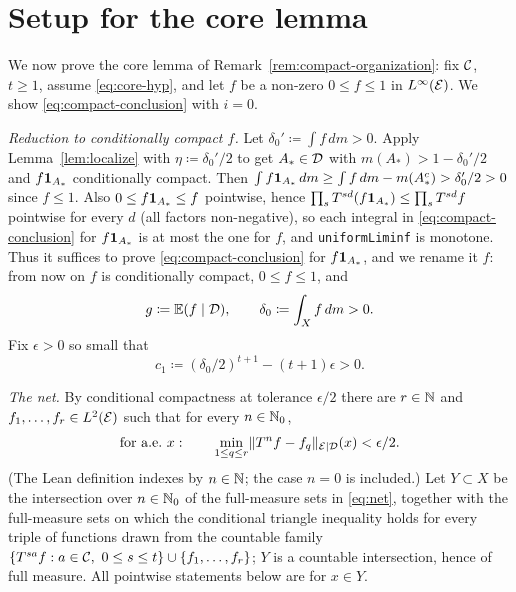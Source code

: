 \section{Setup for the core lemma}

We now prove the core lemma of Remark~\ref{rem:compact-organization}: fix $\mathcal{C}$, $t \geq 1$,
assume \eqref{eq:core-hyp}, and let $f$ be a non-zero $0 \leq f \leq 1$ in $L^{\infty}(\mathcal{E})$.
We show \eqref{eq:compact-conclusion} with $i = 0$.

\emph{Reduction to conditionally compact $f$.}  Let $\delta_0' \coloneqq \int f\,dm > 0$.  Apply
Lemma~\ref{lem:localize} with $\eta \coloneqq \delta_0'/2$ to get $A_\ast \in \mathcal{D}$ with
$m(A_\ast) > 1 - \delta_0'/2$ and $f\mathbf{1}_{A_\ast}$ conditionally compact.  Then
$\int f\mathbf{1}_{A_\ast}\,dm \geq \int f\,dm - m(A_\ast^c) > \delta_0'/2 > 0$ since $f \leq 1$.
Also $0 \leq f\mathbf{1}_{A_\ast} \leq f$ pointwise, hence
$\prod_s T^{sd}(f\mathbf{1}_{A_\ast}) \leq \prod_s T^{sd}f$ pointwise for every $d$ (all factors
non-negative), so each integral in \eqref{eq:compact-conclusion} for $f\mathbf{1}_{A_\ast}$ is at most
the one for $f$, and \texttt{uniformLiminf} is monotone.  Thus it suffices to prove
\eqref{eq:compact-conclusion} for $f\mathbf{1}_{A_\ast}$, and we rename it $f$: from now on $f$ is
conditionally compact, $0 \leq f \leq 1$, and
\[
  g \coloneqq \mathbb{E}(f\mid\mathcal{D}), \qquad \delta_0 \coloneqq \int_X f\,dm > 0 .
\]
Fix $\epsilon > 0$ so small that
\begin{equation}
  \label{eq:eps-choice}
  c_1 \coloneqq (\delta_0/2)^{t+1} - (t+1)\epsilon > 0 .
\end{equation}

\emph{The net.}  By conditional compactness at tolerance $\epsilon/2$ there are $r \in \mathbb{N}$ and
$f_1,\dots,f_r \in L^2(\mathcal{E})$ such that for every $n \in \mathbb{N}_0$,
\begin{equation}
  \label{eq:net}
  \text{for a.e.\ } x : \qquad \min_{1 \leq q \leq r} \lVert T^n f - f_q \rVert_{\mathcal{E} \mid \mathcal{D}}(x) < \epsilon/2 .
\end{equation}
(The Lean definition indexes by $n \in \mathbb{N}$; the case $n = 0$ is included.)  Let
$Y \subset X$ be the intersection over $n \in \mathbb{N}_0$ of the full-measure sets in \eqref{eq:net},
together with the full-measure sets on which the conditional triangle inequality holds for
every triple of functions drawn from the countable family
$\{T^{sa}f : a \in \mathcal{C},\ 0 \leq s \leq t\} \cup \{f_1,\dots,f_r\}$; $Y$ is a countable
intersection, hence of full measure.  All pointwise statements below are for $x \in Y$.

